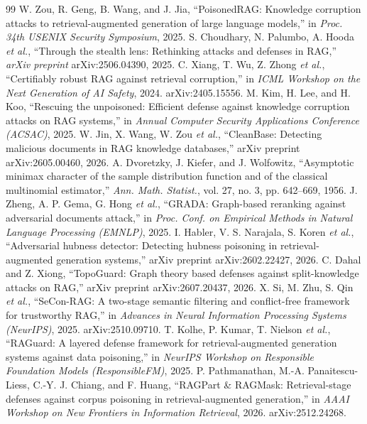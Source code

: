\documentclass[10pt,journal,compsoc]{IEEEtran}
\begin{document}

\begin{thebibliography}{99}
 W. Zou, R. Geng, B. Wang, and J. Jia, ``PoisonedRAG: Knowledge corruption attacks to retrieval-augmented generation of large language models,'' in \emph{Proc. 34th USENIX Security Symposium}, 2025.
 S. Choudhary, N. Palumbo, A. Hooda \emph{et al.}, ``Through the stealth lens: Rethinking attacks and defenses in RAG,'' \emph{arXiv preprint} arXiv:2506.04390, 2025.
 C. Xiang, T. Wu, Z. Zhong \emph{et al.}, ``Certifiably robust RAG against retrieval corruption,'' in \emph{ICML Workshop on the Next Generation of AI Safety}, 2024. arXiv:2405.15556.
 M. Kim, H. Lee, and H. Koo, ``Rescuing the unpoisoned: Efficient defense against knowledge corruption attacks on RAG systems,'' in \emph{Annual Computer Security Applications Conference (ACSAC)}, 2025.
 W. Jin, X. Wang, W. Zou \emph{et al.}, ``CleanBase: Detecting malicious documents in RAG knowledge databases,'' arXiv preprint arXiv:2605.00460, 2026.
 A. Dvoretzky, J. Kiefer, and J. Wolfowitz, ``Asymptotic minimax character of the sample distribution function and of the classical multinomial estimator,'' \emph{Ann. Math. Statist.}, vol. 27, no. 3, pp. 642--669, 1956.
 J. Zheng, A. P. Gema, G. Hong \emph{et al.}, ``GRADA: Graph-based reranking against adversarial documents attack,'' in \emph{Proc. Conf. on Empirical Methods in Natural Language Processing (EMNLP)}, 2025.
 I. Habler, V. S. Narajala, S. Koren \emph{et al.}, ``Adversarial hubness detector: Detecting hubness poisoning in retrieval-augmented generation systems,'' arXiv preprint arXiv:2602.22427, 2026.
 C. Dahal and Z. Xiong, ``TopoGuard: Graph theory based defenses against split-knowledge attacks on RAG,'' arXiv preprint arXiv:2607.20437, 2026.
 X. Si, M. Zhu, S. Qin \emph{et al.}, ``SeCon-RAG: A two-stage semantic filtering and conflict-free framework for trustworthy RAG,'' in \emph{Advances in Neural Information Processing Systems (NeurIPS)}, 2025. arXiv:2510.09710.
 T. Kolhe, P. Kumar, T. Nielson \emph{et al.}, ``RAGuard: A layered defense framework for retrieval-augmented generation systems against data poisoning,'' in \emph{NeurIPS Workshop on Responsible Foundation Models (ResponsibleFM)}, 2025.
 P. Pathmanathan, M.-A. Panaitescu-Liess, C.-Y. J. Chiang, and F. Huang, ``RAGPart \& RAGMask: Retrieval-stage defenses against corpus poisoning in retrieval-augmented generation,'' in \emph{AAAI Workshop on New Frontiers in Information Retrieval}, 2026. arXiv:2512.24268.

\end{thebibliography}
\end{document}
